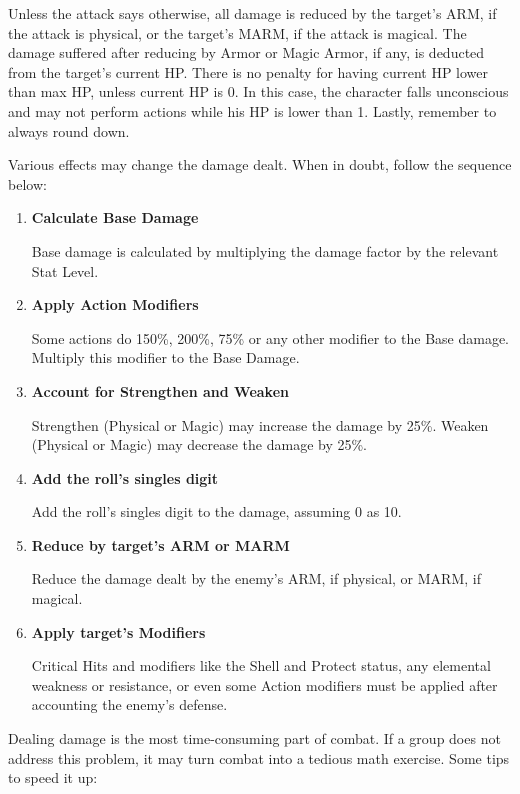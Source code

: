 \begin{multicols}{2}
Unless the attack says otherwise, all damage is reduced by the target's ARM, if the attack is physical, or the target’s MARM, if the attack is magical. The damage suffered after reducing by Armor or Magic Armor, if any, is deducted from the target’s current HP\@. There is no penalty for having current HP lower than max HP, unless current HP is 0. In this case, the character falls unconscious and may not perform actions while his HP is lower than 1. Lastly, remember to always round down.

Various effects may change the damage dealt. When in doubt, follow the sequence below:
\begin{enumerate}
\item \textbf{Calculate Base Damage}

Base damage is calculated by multiplying the damage factor by the relevant Stat Level.

\item \textbf{Apply Action Modifiers}

Some actions do 150\%, 200\%, 75\% or any other modifier to the Base damage. Multiply this modifier to the Base Damage.

\item \textbf{Account for Strengthen and Weaken}

Strengthen (Physical or Magic) may increase the damage by 25\%. Weaken (Physical or Magic) may decrease the damage by 25\%.

\item \textbf{Add the roll's singles digit}

Add the roll's singles digit to the damage, assuming 0 as 10.

\item \textbf{Reduce by target's ARM or MARM}

Reduce the damage dealt by the enemy's ARM, if physical, or MARM, if magical.

\item \textbf{Apply target's Modifiers}

Critical Hits and modifiers like the Shell and Protect status, any elemental weakness or resistance, or even some Action modifiers must be applied after accounting the enemy's defense.
\end{enumerate}

\begin{boco}
Dealing damage is the most time-consuming part of combat. If a group does not address this problem, it may turn combat into a tedious math exercise. Some tips to speed it up:


\end{boco}
\end{multicols}
